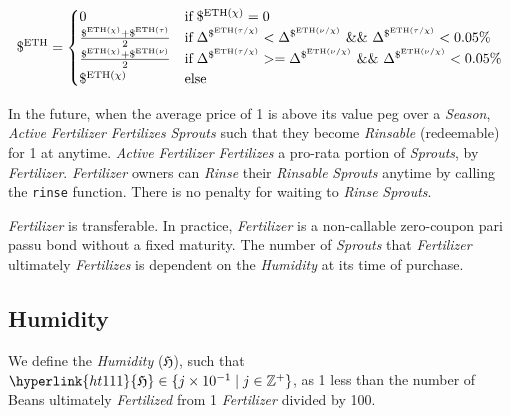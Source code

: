 \documentclass[tikz]{article}
\newcommand{\code}[1]{\texttt{#1}}
\newcommand{\term}[1]{\textsl{#1}}
\newcommand{\Bean}{} %
\begin{document}
    $$ 
        \$^{\text{ETH}} =
        \begin{cases}
            {0} 
                & \text{if} \; \$^{\text{ETH}(\chi)} = 0  \\
            
            {\frac{\$^{\text{ETH}(\chi)} + \$^{\text{ETH}(\tau)}}
                    {2}} 
                & \text{if} \; 
                    \Delta^{\$^{\text{ETH}(\tau \slash \chi)}} < \Delta^{\$^{\text{ETH}(\nu \slash \chi)}} \mkern6mu \&\& 
                    \mkern6mu \Delta^{\$^{\text{ETH}(\tau \slash \chi)}} < 0.05\% \\
            
            {\frac{\$^{\text{ETH}(\chi)} + \$^{\text{ETH}(\nu)}}
                    {2}} 
                & \text{if} \; 
                    \Delta^{\$^{\text{ETH}(\tau \slash \chi)}} >= \Delta^{\$^{\text{ETH}(\nu \slash \chi)}} \mkern6mu \&\& 
                    \mkern6mu \Delta^{\$^{\text{ETH}(\nu \slash \chi)}} < 0.05\% \\
            
            {\$^{\text{ETH}(\chi)}} 
                & \text{else}
        \end{cases} 
    $$

\newpage
In the future, when the average price of \Bean1 is above its value peg over a \term{Season}, \term{Active} \term{Fertilizer} \term{Fertilizes} \term{Sprouts} such that they become \term{Rinsable} (redeemable) for \Bean1 at anytime. \term{Active} \term{Fertilizer} \term{Fertilizes} a pro-rata portion of \term{Sprouts}, by \term{Fertilizer}. \term{Fertilizer} owners can \term{Rinse} their \term{Rinsable} \term{Sprouts} anytime by calling the \code{rinse} function. There is no penalty for waiting to \term{Rinse} \term{Sprouts}.

\term{Fertilizer} is transferable. In practice, \term{Fertilizer} is a non-callable zero-coupon pari passu bond without a fixed maturity. The number of \term{Sprouts} that \term{Fertilizer} ultimately \term{Fertilizes} is dependent on the \term{Humidity} at its time of purchase.


\subsection{Humidity}

We define the \term{Humidity} (\hyperlink{ht111}{$\mathfrak{H}$}), such that $\hyperlink{ht111}{\mathfrak{H}} \in \{j \times 10^{-1} \mid j \in \mathbb{Z}^{+} \}$, as 1 less than the number of Beans ultimately \term{Fertilized} from 1 \term{Fertilizer} divided by 100. 
\end{document}
